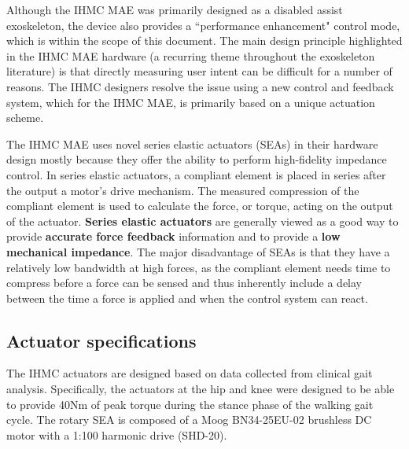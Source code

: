 \begin{refsection}

Although the IHMC MAE was primarily designed as a disabled assist exoskeleton, the device also provides a ``performance enhancement" control mode, which is within the scope of this document.  The main design principle highlighted in the IHMC MAE hardware (a recurring theme throughout the exoskeleton literature) is that directly measuring user intent can be difficult for a number of reasons.  The IHMC designers resolve the issue using a new control and feedback system, which for the IHMC MAE, is primarily based on a unique actuation scheme. 

The IHMC MAE uses novel series elastic actuators (SEAs) in their hardware design mostly because they offer the ability to perform high-fidelity impedance control.  In series elastic actuators, a compliant element is placed in series after the output a motor's drive mechanism. The measured compression of the compliant element is used to calculate the force, or torque, acting on the output of the actuator.  { \bf Series elastic actuators} are generally viewed as a good way to provide {\bf accurate force feedback} information and to provide a {\bf low mechanical impedance}.  The major disadvantage of SEAs is that they have a relatively low bandwidth at high forces, as the compliant element needs time to compress before a force can be sensed and thus inherently include a delay between the time a force is applied and when the control system can react.


\subsection{Actuator specifications}

The IHMC actuators are designed based on data collected from clinical gait analysis.  Specifically, the actuators at the hip and knee were designed to be able to provide 40Nm of peak torque during the stance phase of the walking gait cycle.  The rotary SEA is composed of a Moog BN34-25EU-02 brushless DC motor with a 1:100 harmonic drive (SHD-20).  
 

\end{refsection}
